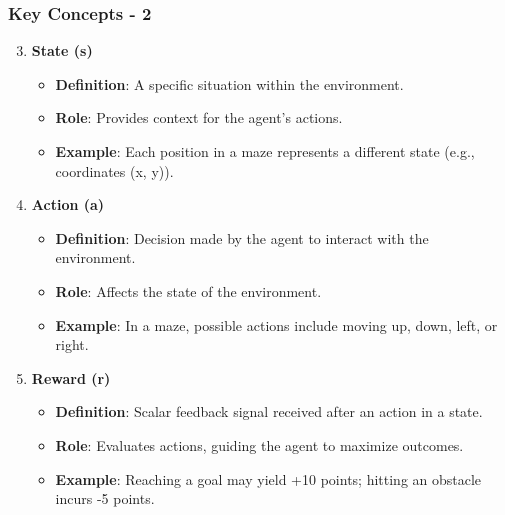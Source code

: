 \documentclass{beamer}
\begin{document}
\begin{frame}[fragile]
    \frametitle{Key Concepts - 2}
    \begin{enumerate}
        \setcounter{enumi}{2} %
        \item \textbf{State (s)}
        \begin{itemize}
            \item \textbf{Definition}: A specific situation within the environment.
            \item \textbf{Role}: Provides context for the agent's actions.
            \item \textbf{Example}: Each position in a maze represents a different state (e.g., coordinates (x, y)).
        \end{itemize}
        
        \item \textbf{Action (a)}
        \begin{itemize}
            \item \textbf{Definition}: Decision made by the agent to interact with the environment.
            \item \textbf{Role}: Affects the state of the environment.
            \item \textbf{Example}: In a maze, possible actions include moving up, down, left, or right.
        \end{itemize}

        \item \textbf{Reward (r)}
        \begin{itemize}
            \item \textbf{Definition}: Scalar feedback signal received after an action in a state.
            \item \textbf{Role}: Evaluates actions, guiding the agent to maximize outcomes.
            \item \textbf{Example}: Reaching a goal may yield +10 points; hitting an obstacle incurs -5 points.
        \end{itemize}
    \end{enumerate}
\end{frame}
\end{document}
